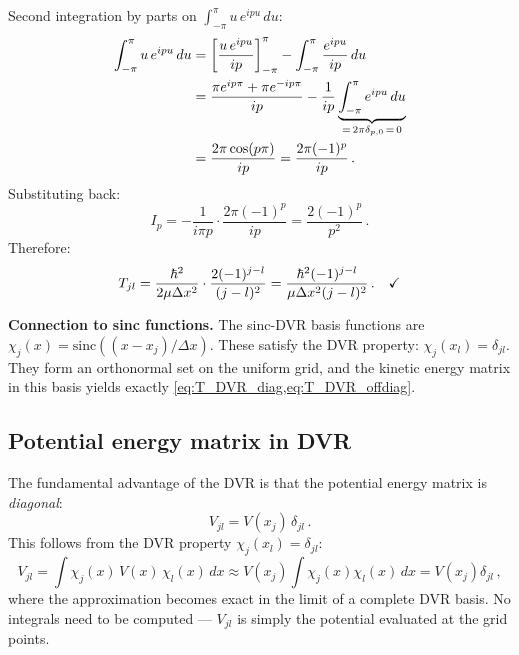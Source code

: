Second integration by parts on $\int_{-\pi}^{\pi}u\,e^{ipu}\,du$:
\begin{align}
  \int_{-\pi}^{\pi}u\,e^{ipu}\,du
  &= \left[\frac{u\,e^{ipu}}{ip}\right]_{-\pi}^{\pi} - \int_{-\pi}^{\pi}\frac{e^{ipu}}{ip}\,du\notag\\
  &= \frac{\pi e^{ip\pi}+\pi e^{-ip\pi}}{ip} - \frac{1}{ip}\underbrace{\int_{-\pi}^{\pi}e^{ipu}\,du}_{=\,2\pi\delta_{p,0}\,=\,0}\notag\\
  &= \frac{2\pi\cos(p\pi)}{ip} = \frac{2\pi(-1)^p}{ip}\,.
\end{align}
Substituting back:
\begin{equation}
  I_p = -\frac{1}{i\pi p}\cdot\frac{2\pi(-1)^p}{ip} = \frac{2(-1)^p}{p^2}\,.
\end{equation}
Therefore:
\begin{equation}
  T_{jl} = \frac{\hbar^2}{2\mu\Delta x^2}\cdot\frac{2(-1)^{j-l}}{(j-l)^2}
  = \frac{\hbar^2(-1)^{j-l}}{\mu\Delta x^2(j-l)^2}\,.\quad\checkmark
\end{equation}

\textbf{Connection to sinc functions.} The sinc-DVR basis functions are
$\chi_j(x) = \text{sinc}((x-x_j)/\Delta x)$. These satisfy the DVR property:
$\chi_j(x_l) = \delta_{jl}$. They form an orthonormal set on the uniform grid,
and the kinetic energy matrix in this basis yields exactly \cref{eq:T_DVR_diag,eq:T_DVR_offdiag}.

\subsection{Potential energy matrix in DVR}\label{sec:DVR_V}

The fundamental advantage of the DVR is that the potential energy matrix is \emph{diagonal}:
\begin{equation}\label{eq:V_DVR}
  \boxed{V_{jl} = V(x_j)\,\delta_{jl}\,.}
\end{equation}
This follows from the DVR property $\chi_j(x_l) = \delta_{jl}$:
\begin{equation}
  V_{jl} = \int\chi_j(x)\,V(x)\,\chi_l(x)\,dx \approx V(x_j)\int\chi_j(x)\chi_l(x)\,dx = V(x_j)\delta_{jl}\,,
\end{equation}
where the approximation becomes exact in the limit of a complete DVR basis.
No integrals need to be computed --- $V_{jl}$ is simply the potential evaluated at the grid points.

